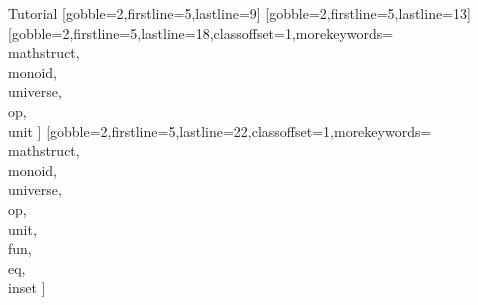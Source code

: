\documentclass{stex}
\begin{document}
  \begin{sfragment}{Tutorial}
    [gobble=2,firstline=5,lastline=9]
    [gobble=2,firstline=5,lastline=13]
    [gobble=2,firstline=5,lastline=18,classoffset=1,morekeywords={
    \\mathstruct,\\monoid,\\universe,\\op,\\unit
    }]
    [gobble=2,firstline=5,lastline=22,classoffset=1,morekeywords={
    \\mathstruct,\\monoid,\\universe,\\op,\\unit,\\fun,\\eq,\\inset
    }]
  \end{sfragment}
  
\end{document}
